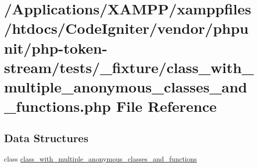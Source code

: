 \hypertarget{class__with__multiple__anonymous__classes__and__functions_8php}{}\section{/\+Applications/\+X\+A\+M\+P\+P/xamppfiles/htdocs/\+Code\+Igniter/vendor/phpunit/php-\/token-\/stream/tests/\+\_\+fixture/class\+\_\+with\+\_\+multiple\+\_\+anonymous\+\_\+classes\+\_\+and\+\_\+functions.php File Reference}
\label{class__with__multiple__anonymous__classes__and__functions_8php}
\subsection*{Data Structures}
\begin{DoxyCompactItemize}
\item 
class \mbox{\hyperlink{classclass__with__multiple__anonymous__classes__and__functions}{class\+\_\+with\+\_\+multiple\+\_\+anonymous\+\_\+classes\+\_\+and\+\_\+functions}}
\end{DoxyCompactItemize}
